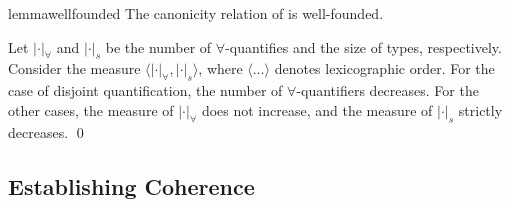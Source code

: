 \begin{restatable}{lemma}{wellfounded}\label{lemma:well-founded}
  The canonicity relation of \fnamee is well-founded.
\end{restatable}
\proof
  Let $| \cdot |_{\forall}$ and $| \cdot |_s$ be the number of
  $\forall$-quantifies and the size of types, respectively. Consider the measure $\langle
  | \cdot |_{\forall} , | \cdot |_s \rangle$,
  where $\langle \dots \rangle$ denotes lexicographic order. For the case of
  disjoint quantification, the number of $\forall$-quantifiers decreases.
  For the other cases, the measure of $| \cdot |_{\forall}$ does not increase, and
  the measure of $| \cdot |_s$ strictly decreases.
\qed







\subsection{Establishing Coherence}

